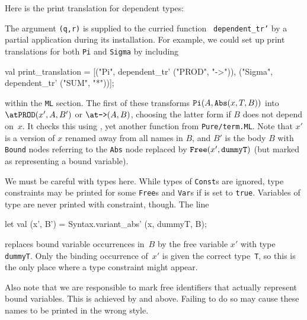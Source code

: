 Here is the print translation for dependent types:
The argument {\tt (q,{\thinspace}r)} is supplied to the curried function {\tt
  dependent_tr'} by a partial application during its installation.
For example, we could set up print translations for both {\tt Pi} and
{\tt Sigma} by including
\begin{ttbox}
val print_translation =
  [("Pi",    dependent_tr' ("{\at}PROD", "{\at}->")),
   ("Sigma", dependent_tr' ("{\at}SUM", "{\at}*"))];
\end{ttbox}
within the {\tt ML} section.  The first of these transforms ${\tt
  Pi}(A, (x, T, B))$ into $\hbox{\tt{\at}PROD}(x', A, B')$ or
$\hbox{\tt{\at}->}(A, B)$, choosing the latter form if $B$ does not
depend on~$x$.  It checks this using , yet another
function from {\tt Pure/term.ML}.  Note that $x'$ is a version of $x$
renamed away from all names in $B$, and $B'$ is the body $B$ with {\tt
  Bound} nodes referring to the {\tt Abs} node replaced by
$ (x', )$ (but marked as representing a bound
variable).

We must be careful with types here.  While types of {\tt Const}s are
ignored, type constraints may be printed for some {\tt Free}s and
{\tt Var}s if  is set to {\tt true}.  Variables of type
 are never printed with constraint, though.  The line
\begin{ttbox}
        let val (x', B') = Syntax.variant_abs' (x, dummyT, B);
\end{ttbox}
replaces bound variable occurrences in~$B$ by the free variable $x'$ with
type {\tt dummyT}.  Only the binding occurrence of~$x'$ is given the
correct type~{\tt T}, so this is the only place where a type
constraint might appear.

Also note that we are responsible to mark free identifiers that
actually represent bound variables.  This is achieved by
 and  above.
Failing to do so may cause these names to be printed in the wrong
style.   


